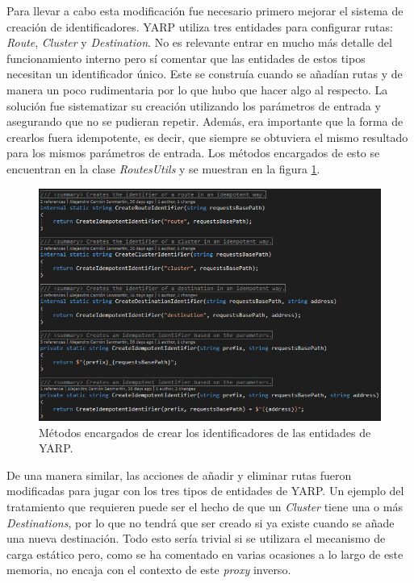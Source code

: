\documentclass[11pt,spanish,listoffigures]{tfgetsinf}
\begin{document}
Para llevar a cabo esta modificación fue necesario primero mejorar el sistema de creación de identificadores. YARP utiliza tres entidades para configurar rutas: \emph{Route}, \emph{Cluster} y \emph{Destination}. No es relevante entrar en mucho más detalle del funcionamiento interno pero sí comentar que las entidades de estos tipos necesitan un identificador único. Este se construía cuando se añadían rutas y de manera un poco rudimentaria por lo que hubo que hacer algo al respecto. La solución fue sistematizar su creación utilizando los parámetros de entrada y asegurando que no se pudieran repetir. Además, era importante que la forma de crearlos fuera idempotente, es decir, que siempre se obtuviera el mismo resultado para los mismos parámetros de entrada. Los métodos encargados de esto se encuentran en la clase \emph{RoutesUtils} y se muestran en la figura \ref{creacionIdentificadores}.

\begin{figure}[ht]
\centering
\includegraphics[width=1\textwidth]{imagenes/creacionIdentificadores}
\caption{Métodos encargados de crear los identificadores de las entidades de YARP.}
	\label{creacionIdentificadores}
\end{figure}

De una manera similar, las acciones de añadir y eliminar rutas fueron modificadas para jugar con los tres tipos de entidades de YARP. Un ejemplo del tratamiento que requieren puede ser el hecho de que un \emph{Cluster} tiene una o más \emph{Destinations}, por lo que no tendrá que ser creado si ya existe cuando se añade una nueva destinación. Todo esto sería trivial si se utilizara el mecanismo de carga estático pero, como se ha comentado en varias ocasiones a lo largo de este memoria, no encaja con el contexto de este \emph{proxy} inverso.
\end{document}
